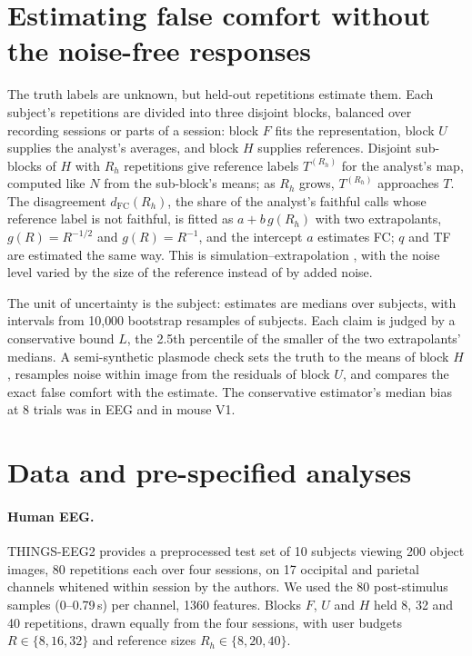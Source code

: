 \documentclass[11pt]{article}
\begin{document}
\section{Estimating false comfort without the noise-free responses}\label{sec:est}

The truth labels are unknown, but held-out repetitions estimate them. Each subject's repetitions
are divided into three disjoint blocks, balanced over recording sessions or parts of a session:
block $F$ fits the representation, block $U$ supplies the analyst's averages, and block $H$
supplies references. Disjoint sub-blocks of $H$ with $R_h$ repetitions give reference labels
$T^{(R_h)}$ for the analyst's map, computed like $N$ from the sub-block's means; as $R_h$ grows,
$T^{(R_h)}$ approaches $T$. The disagreement $d_{\mathrm{FC}}(R_h)$, the share of the analyst's
faithful calls whose reference label is not faithful, is fitted as $a+b\,g(R_h)$ with two
extrapolants, $g(R)=R^{-1/2}$ and $g(R)=R^{-1}$, and the intercept $a$ estimates FC; $q$ and TF
are estimated the same way. This is simulation--extrapolation \citep{cook1994,devanarayan2002},
with the noise level varied by the size of the reference instead of by added noise.

The unit of uncertainty is the subject: estimates are medians over subjects, with intervals from
10{,}000 bootstrap resamples of subjects. Each claim is judged by a conservative bound $L$, the
2.5th percentile of the smaller of the two extrapolants' medians. A semi-synthetic plasmode check
\citep{schreck2023} sets the truth to the means of block $H$, resamples noise within image from
the residuals of block $U$, and compares the exact false comfort with the estimate. The
conservative estimator's median bias at 8 trials was \EegBias{} in EEG and \MouseBias{} in
mouse V1.

\section{Data and pre-specified analyses}\label{sec:data}

\paragraph{Human EEG.} THINGS-EEG2 \citep{gifford2022} provides a preprocessed test set of
10 subjects viewing 200 object images, 80 repetitions each over four sessions, on 17 occipital
and parietal channels whitened within session by the authors. We used the 80 post-stimulus
samples (0--0.79\,s) per channel, 1360 features. Blocks $F$, $U$ and $H$ held 8, 32 and 40
repetitions, drawn equally from the four sessions, with user budgets $R\in\{8,16,32\}$ and
reference sizes $R_h\in\{8,20,40\}$.
\end{document}
